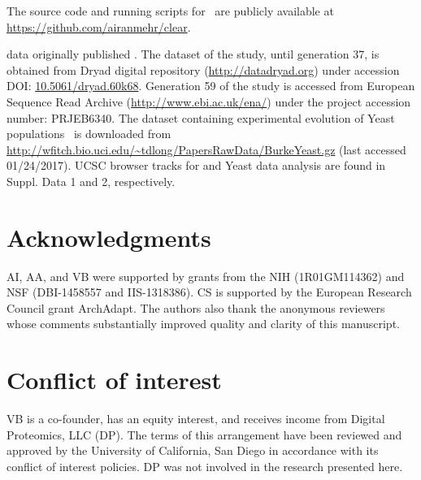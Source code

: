 \documentclass[9pt,twocolumn,twoside]{gsajnl}
\begin{document}
The source code and running scripts for \comale\ are publicly available at 
\url{https://github.com/airanmehr/clear}. 

\dmel data originally published 
\cite{orozco2012adaptation,franssen2015patterns}. The dataset of the 
\dmel study, until generation 37, is obtained from Dryad 
digital repository (\url{http://datadryad.org}) under 
accession DOI: 
\href{http://datadryad.org/resource/doi:10.5061/dryad.60k68}{10.5061/dryad.60k68}.
Generation 59 of the \dmel study is accessed from
European Sequence Read Archive 
(\href{http://www.ebi.ac.uk/ena/}{http://www.ebi.ac.uk/ena/})  under 
the 
project accession number: PRJEB6340.
The dataset containing experimental evolution of Yeast 
populations~\cite{burke2014standing} is 
downloaded from 
\url{http://wfitch.bio.uci.edu/~tdlong/PapersRawData/BurkeYeast.gz}
(last accessed 01/24/2017). 
UCSC browser tracks for \dmel and Yeast data analysis are found in Suppl. 
Data 
1 and 2, respectively.
\section*{Acknowledgments}
AI, AA, and VB were supported by grants from the NIH (1R01GM114362) and
NSF (DBI-1458557 and IIS-1318386). CS is supported by the European 
Research 
Council grant ArchAdapt.
The authors also thank the anonymous reviewers whose comments 
substantially improved quality and clarity of this manuscript.

\section*{Conflict of interest}
VB is a co-founder, has an equity interest, and receives income from
Digital Proteomics, LLC (DP).  The terms of this arrangement have been
reviewed and approved by the University of California, San Diego in
accordance with its conflict of interest policies.  DP was not
involved in the research presented here.

\end{document}
